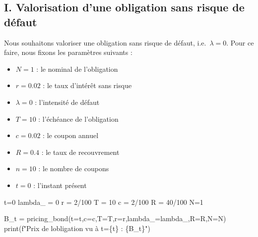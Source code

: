 \documentclass[
  letterpaper,
  DIV=11,
  numbers=noendperiod]{scrartcl}
\newenvironment{Shaded}{\begin{snugshade}}{\end{snugshade}}
\newcommand{\BuiltInTok}[1]{\textcolor[rgb]{0.00,0.23,0.31}{#1}}
\newcommand{\DecValTok}[1]{\textcolor[rgb]{0.68,0.00,0.00}{#1}}
\newcommand{\NormalTok}[1]{\textcolor[rgb]{0.00,0.23,0.31}{#1}}
\newcommand{\OperatorTok}[1]{\textcolor[rgb]{0.37,0.37,0.37}{#1}}
\newcommand{\SpecialCharTok}[1]{\textcolor[rgb]{0.37,0.37,0.37}{#1}}
\newcommand{\SpecialStringTok}[1]{\textcolor[rgb]{0.13,0.47,0.30}{#1}}
\providecommand{\tightlist}{%
  \setlength{\itemsep}{0pt}\setlength{\parskip}{0pt}}\usepackage{longtable,booktabs,array}
\begin{document}
\subsection{I. Valorisation d'une obligation sans risque de
défaut}\label{i.-valorisation-dune-obligation-sans-risque-de-duxe9faut}

Nous souhaitons valoriser une obligation sans risque de défaut,
i.e.~\(\lambda = 0\). Pour ce faire, nous fixons les paramètres suivants
:

\begin{itemize}
\tightlist
\item
  \(N = 1\) : le nominal de l'obligation
\item
  \(r = 0.02\) : le taux d'intérêt sans risque
\item
  \(\lambda = 0\) : l'intensité de défaut
\item
  \(T = 10\) : l'échéance de l'obligation
\item
  \(c = 0.02\) : le coupon annuel
\item
  \(R = 0.4\) : le taux de recouvrement
\item
  \(n = 10\) : le nombre de coupons
\item
  \(t = 0\) : l'instant présent
\end{itemize}

\begin{Shaded}
\begin{Highlighting}[]
\NormalTok{t}\OperatorTok{=}\DecValTok{0}
\NormalTok{lambda\_ }\OperatorTok{=} \DecValTok{0}
\NormalTok{r }\OperatorTok{=} \DecValTok{2}\OperatorTok{/}\DecValTok{100}
\NormalTok{T }\OperatorTok{=} \DecValTok{10}
\NormalTok{c }\OperatorTok{=} \DecValTok{2}\OperatorTok{/}\DecValTok{100}
\NormalTok{R }\OperatorTok{=} \DecValTok{40}\OperatorTok{/}\DecValTok{100}
\NormalTok{N}\OperatorTok{=}\DecValTok{1}

\NormalTok{B\_t }\OperatorTok{=}\NormalTok{ pricing\_bond(t}\OperatorTok{=}\NormalTok{t,c}\OperatorTok{=}\NormalTok{c,T}\OperatorTok{=}\NormalTok{T,r}\OperatorTok{=}\NormalTok{r,lambda\_}\OperatorTok{=}\NormalTok{lambda\_,R}\OperatorTok{=}\NormalTok{R,N}\OperatorTok{=}\NormalTok{N)}
\BuiltInTok{print}\NormalTok{(}\SpecialStringTok{f"Prix de l\textquotesingle{}obligation vu à t=}\SpecialCharTok{\{}\NormalTok{t}\SpecialCharTok{\}}\SpecialStringTok{ : }\SpecialCharTok{\{}\NormalTok{B\_t}\SpecialCharTok{\}}\SpecialStringTok{"}\NormalTok{)}
\end{Highlighting}
\end{Shaded}
\end{document}
